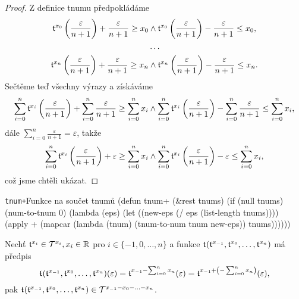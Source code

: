 \begin{theorem}
\begin{proof}
Z definice tnumu předpokládáme
\begin{equation}
\begin{aligned}
\mathfrak{t}^{x_0}\left(\frac{\varepsilon}{n+1}\right)+\frac{\varepsilon}{n+1}\geq x_0 &\land \mathfrak{t}^{x_0}\left(\frac{\varepsilon}{n+1}\right)-\frac{\varepsilon}{n+1}\leq x_0,\\
&\ldots \\
\mathfrak{t}^{x_n}\left(\frac{\varepsilon}{n+1}\right)+\frac{\varepsilon}{n+1}\geq x_n &\land \mathfrak{t}^{x_n}\left(\frac{\varepsilon}{n+1}\right)-\frac{\varepsilon}{n+1}\leq x_n.\\
\end{aligned}
\end{equation}
Sečtěme teď všechny výrazy a získáváme
\begin{equation}
\sum_{i=0}^n\mathfrak{t}^{x_i}\left(\frac{\varepsilon}{n+1}\right) + \sum_{i=0}^n\frac{\varepsilon}{n+1} \geq \sum_{i=0}^nx_i \land \sum_{i=0}^n\mathfrak{t}^{x_i}\left(\frac{\varepsilon}{n+1}\right) - \sum_{i=0}^n\frac{\varepsilon}{n+1} \leq \sum_{i=0}^nx_i,
\end{equation}
dále $\sum_{i=0}^n\frac{\varepsilon}{n+1} = \varepsilon$, takže
\begin{equation}
\sum_{i=0}^n\mathfrak{t}^{x_i}\left(\frac{\varepsilon}{n+1}\right) + \varepsilon \geq \sum_{i=0}^nx_i \land \sum_{i=0}^n\mathfrak{t}^{x_i}\left(\frac{\varepsilon}{n+1}\right) - \varepsilon \leq \sum_{i=0}^nx_i,
\end{equation}
což jsme chtěli ukázat.
\end{proof}
\end{theorem}

\begin{lispcode}{\texttt{tnum+}}{Funkce na součet tnumů}
(\textcolor{funkcionalni}{defun} \textcolor{pojmenovan}{tnum+} (&rest tnums)
  (\textcolor{funkcionalni}{if} (\textcolor{funkcionalni}{null} tnums)
      (\textcolor{moje}{num-to-tnum} 0)
    (\textcolor{funkcionalni}{lambda} (eps)
      (\textcolor{vedlejsi}{let} ((new-eps (\textcolor{matematicke}{/} eps (\textcolor{funkcionalni}{list-length} tnums))))
        (\textcolor{funkcionalni}{apply} \textquotesingle\textcolor{moje}{+} 
               (\textcolor{funkcionalni}{mapcar} (\textcolor{funkcionalni}{lambda} (tnum) 
                         (\textcolor{moje}{tnum-to-num} tnum new-eps))
                       tnums))))))
\end{lispcode}

\begin{fact}
Nechť $\mathfrak{t}^{x_{i}}\in\mathcal{T}^{x_{i}}, x_i\in\mathbb{R}$ pro $i\in\{-1,0,\ldots,n\}$ a funkce $\mathfrak{t}^{}(\mathfrak{t}^{x_{-1}},\mathfrak{t}^{x_0},\ldots,\mathfrak{t}^{x_n})$ má předpis
\begin{equation}
\mathfrak{t}^{}(\mathfrak{t}^{x_{-1}},\mathfrak{t}^{x_0},\ldots,\mathfrak{t}^{x_n})(\varepsilon)=\mathfrak{t}^{x_{-1}-\sum_{i=0}^nx_n}(\varepsilon)=\mathfrak{t}^{x_{-1}+\left(-\sum_{i=0}^nx_n\right)}(\varepsilon),
\end{equation}
pak $\mathfrak{t}^{}(\mathfrak{t}^{x_{-1}},\mathfrak{t}^{x_0},\ldots,\mathfrak{t}^{x_n})\in\mathcal{T}^{x_{-1}-x_0-\ldots -x_n}$.
\end{fact}

